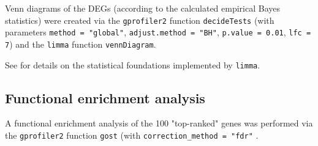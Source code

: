 Venn diagrams of the DEGs (according to the calculated empirical Bayes statistics) were created via the \verb|gprofiler2| function \verb|decideTests| (with parameters \verb|method = "global"|, \verb|adjust.method = "BH"|, \verb|p.value = 0.01|, \verb|lfc = 7|) and the \verb|limma| function \verb|vennDiagram|.

See \autocite{limma2015} for details on the statistical foundations implemented by \verb|limma|.

\subsection{Functional enrichment analysis}

A functional enrichment analysis of the 100 "top-ranked" genes was performed via the \verb|gprofiler2| function \verb|gost| (with \verb|correction_method = "fdr"| \autocite{R-gprofiler2}.